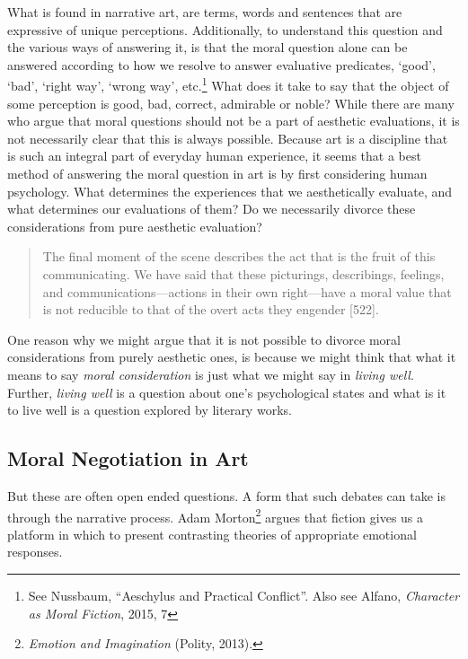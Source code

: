 \documentclass[phdthesis,12pt,final,a4paper]{wuthesis}
\theoremstyle{definition}
\theoremstyle{definition}
\theoremstyle{definition}
\theoremstyle{definition}
\theoremstyle{remark}
\begin{document}
What is found in narrative art, are terms, words and sentences that are expressive of unique perceptions. Additionally, to understand this question and the various ways of answering it, is that the moral question alone can be answered according to how we resolve to answer evaluative predicates, `good', `bad', `right way', `wrong way', etc.\footnote{See Nussbaum, {``Aeschylus and Practical Conflict''}. Also see Alfano, \emph{Character as Moral Fiction}, 2015, 7} What does it take to say that the object of some perception is good, bad, correct, admirable or noble? While there are many who argue that moral questions should not be a part of aesthetic evaluations, it is not necessarily clear that this is always possible. Because art is a discipline that is such an integral part of everyday human experience, it seems that a best method of answering the moral question in art is by first considering human psychology. What determines the experiences that we aesthetically evaluate, and what determines our evaluations of them? Do we necessarily divorce these considerations from pure aesthetic evaluation?

\begin{quote}
The final moment of the scene describes the act that is the fruit of this communicating. We have said that these picturings, describings, feelings, and communications---actions in their own right---have a moral value that is not reducible to that of the overt acts they engender {[}522{]}.
\end{quote}

One reason why we might argue that it is not possible to divorce moral considerations from purely aesthetic ones, is because we might think that what it means to say \emph{moral consideration} is just what we might say in \emph{living well}. Further, \emph{living well} is a question about one's psychological states and what is it to live well is a question explored by literary works.

\subsection*{Moral Negotiation in Art}\label{moral-negotiation-in-art}

But these are often open ended questions. A form that such debates can take is through the narrative process. Adam Morton\footnote{\emph{Emotion and {Imagination}} (Polity, 2013).} argues that fiction gives us a platform in which to present contrasting theories of appropriate emotional responses.
\end{document}
